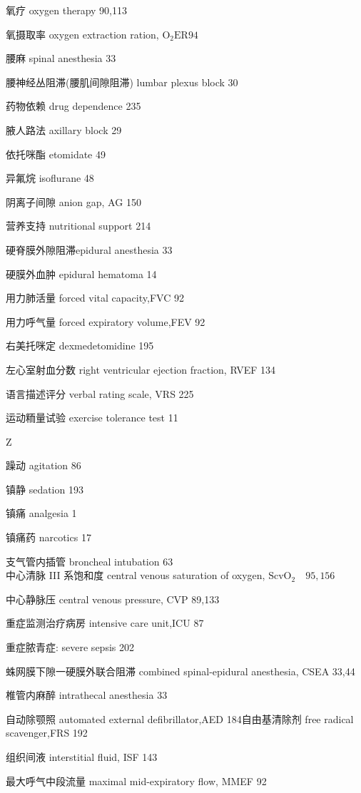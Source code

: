 \documentclass[10pt]{article}
\begin{document}
氧疗 oxygen therapy 90,113

氧摄取率 oxygen extraction ration, $\mathrm{O}_{2} \mathrm{ER} 94$

腰麻 spinal anesthesia 33

腰神经丛阻滞(腰肌间隙阻滞) lumbar plexus block 30

药物依赖 drug dependence 235

腋人路法 axillary block 29

依托咪酯 etomidate 49

异氟烷 isoflurane 48

阴离子间隙 anion gap, AG 150

营养支持 nutritional support 214

硬脊膜外隙阻滞epidural anesthesia 33

硬膜外血肿 epidural hematoma 14

用力肺活量 forced vital capacity,FVC 92

用力呼气量 forced expiratory volume,FEV 92

右美托咪定 dexmedetomidine 195

左心室射血分数 right ventricular ejection fraction, RVEF 134

语言描述评分 verbal rating scale, VRS 225

运动粫量试验 exercise tolerance test 11

Z

躁动 agitation 86

镇静 sedation 193

镇痛 analgesia 1

镇痛药 narcotics 17

支气管内插管 broncheal intubation 63\\
中心清脉 III 系饱和度 central venous saturation of oxygen, $\mathrm{ScvO}_{2} \quad 95,156$

中心静脉压 central venous pressure, CVP 89,133

重症监测治疗病房 intensive care unit,ICU 87

重症脓青症: severe sepsis 202

蛛网膜下隙一硬膜外联合阻滞 combined spinal-epidural anesthesia, CSEA 33,44

椎管内麻醉 intrathecal anesthesia 33

自动除颚照 automated external defibrillator,AED 184自由基清除剂 free radical scavenger,FRS 192

组织间液 interstitial fluid, ISF 143

最大呼气中段流量 maximal mid-expiratory flow, MMEF 92
\end{document}
